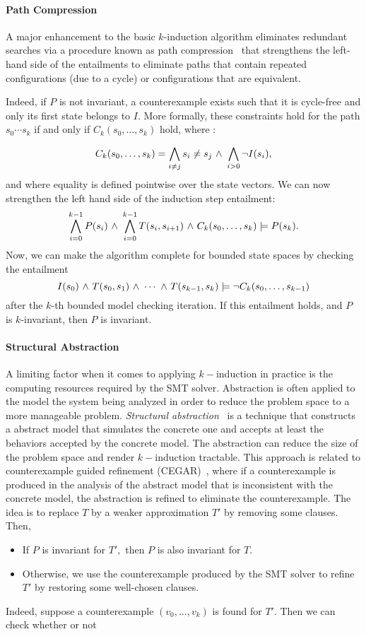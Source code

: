 \paragraph{Path Compression}  A major enhancement to the basic
$k$-induction 
algorithm eliminates redundant searches via a procedure
known as path compression~\cite{dMRS03} that strengthens the left-hand
side of the entailments to eliminate paths that contain repeated configurations  (due to
a cycle) or configurations that are equivalent.  


Indeed, if $P$ is not invariant, a
counterexample exists such that it is cycle-free and only its first state belongs to $I$. More formally, these constraints hold for the path $s_0 \cdots s_k$ if and only if  $C_k(s_0,\ldots,s_k)$ hold, where :

$$C_k(s_0,\ldots,s_k) = \bigwedge_{i \neq j} s_i \neq s_j  {\ \wedge \ }
\bigwedge_{i > 0} {\neg} I(s_i),$$
and where equality is defined  pointwise over the state vectors.
We can now strengthen the left hand side of the induction step
entailment:
$$\bigwedge^{k-1}_{i=0} P(s_i) {\ \wedge \ } \bigwedge ^{k-1}_{i=0}
T(s_i,s_{i+1}) {\ \wedge \ } C_k(s_0, \ldots, s_k) \models P(s_k). $$
Now, we can make the algorithm complete for bounded state spaces by
checking the entailment 
$$I(s_0) {\ \wedge \ } T(s_0,s_1) {\ \wedge \ } \cdots {\ \wedge \ } T(s_{k-1}, s_{k})
 \models {\neg} C_k(s_0,\ldots, s_{k-1})$$
after the $k$-th bounded model checking iteration.  If this entailment
holds, and $P$ is $k$-invariant, then $P$ is invariant. 

\paragraph{Structural Abstraction}
A limiting factor when it comes to applying $k-$induction in practice
is the computing resources required by the SMT solver. Abstraction is
often applied to the model the system being analyzed in order to
reduce the problem space to a more manageable problem.  {\em
  Structural abstraction}~\cite{ bh07structural} is a technique that
constructs a abstract model that simulates the concrete one and
accepts at least the behaviors accepted by the concrete model. The
abstraction can reduce the size of the problem
space and render $k-$induction tractable. This
approach is  
related to counterexample guided refinement
(CEGAR)~\cite{Clarke2003CAR}, where if a counterexample is produced in
the analysis of the abstract model that is inconsistent with the
concrete model, the abstraction is refined to eliminate the
counterexample. The idea is to replace $T$
by a weaker approximation $T'$ by removing some clauses. Then, 
\begin{itemize}
\item If $P$ is invariant for $T',$ then $P$ is also invariant for $T.$
\item Otherwise, we use the counterexample produced by the SMT solver
  to refine $T'$ by restoring some well-chosen clauses.
\end{itemize}  
Indeed, suppose a counterexample $(v_0,\ldots, v_k)$ is found for $T'$. Then we can
check whether or not

